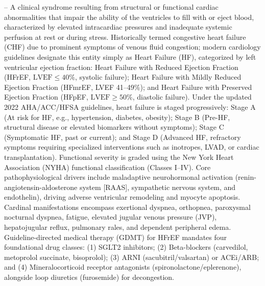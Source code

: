 -- A clinical syndrome resulting from structural or functional cardiac abnormalities that impair the ability of the ventricles to fill with or eject blood, characterized by elevated intracardiac pressures and inadequate systemic perfusion at rest or during stress. Historically termed congestive heart failure (CHF) due to prominent symptoms of venous fluid congestion; modern cardiology guidelines designate this entity simply as Heart Failure (HF), categorized by left ventricular ejection fraction: Heart Failure with Reduced Ejection Fraction (HFrEF, $\text{LVEF} \le 40\%$, systolic failure); Heart Failure with Mildly Reduced Ejection Fraction (HFmrEF, LVEF 41--49\%); and Heart Failure with Preserved Ejection Fraction (HFpEF, $\text{LVEF} \ge 50\%$, diastolic failure). Under the updated 2022 AHA/ACC/HFSA guidelines, heart failure is staged progressively: Stage A (At risk for HF, e.g., hypertension, diabetes, obesity); Stage B (Pre-HF, structural disease or elevated biomarkers without symptoms); Stage C (Symptomatic HF, past or current); and Stage D (Advanced HF, refractory symptoms requiring specialized interventions such as inotropes, LVAD, or cardiac transplantation). Functional severity is graded using the New York Heart Association (NYHA) functional classification (Classes I--IV). Core pathophysiological drivers include maladaptive neurohormonal activation (renin-angiotensin-aldosterone system [RAAS], sympathetic nervous system, and endothelin), driving adverse ventricular remodeling and myocyte apoptosis. Cardinal manifestations encompass exertional dyspnea, orthopnea, paroxysmal nocturnal dyspnea, fatigue, elevated jugular venous pressure (JVP), hepatojugular reflux, pulmonary rales, and dependent peripheral edema. Guideline-directed medical therapy (GDMT) for HFrEF mandates four foundational drug classes: (1) SGLT2 inhibitors; (2) Beta-blockers (carvedilol, metoprolol succinate, bisoprolol); (3) ARNI (sacubitril/valsartan) or ACEi/ARB; and (4) Mineralocorticoid receptor antagonists (spironolactone/eplerenone), alongside loop diuretics (furosemide) for decongestion.

